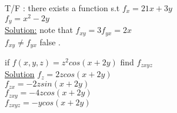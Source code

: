  \begin{example}
 T/F : there exists a function s.t 
 $f_x = 21x + 3y $\\
 $f_y = x^{2} - 2y$\\
 \underline{\textbf{\large}\color{smalt(darkpowderblue)}Solution:} note that 
 $f_{xy} = 3   f_{yx} = 2x $\\
 $f_{xy} \neq f_{yx} $ false .
 \end{example}
 \noindent{\color{smalt(darkpowderblue)}\rule{\linewidth}{.2mm}}

\begin{example}
if $f(x,y,z) = z^{2} cos(x+2y) $ find $f_{zxyz}$\\
\underline{\textbf{\large}\color{smalt(darkpowderblue)}Solution}
$f_z = 2z cos(x+2y)$\\
 $f_{zx} = -2z sin (x+2y)$\\
 $f_{zxy} = -4z cos(x+2y)$\\
 $f_{zxyz} = -ycos(x+2y)$
 \end{example}